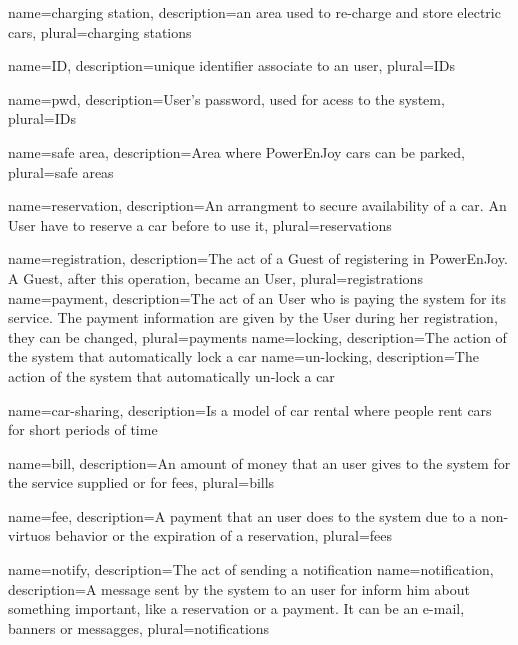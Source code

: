 {
  name={charging station},
  description={an area used to re-charge and store electric cars},
  plural={charging stations}
}

{
  name={ID},
  description={unique identifier associate to an user},
  plural={IDs}
}

{
  name={pwd},
  description={User's password, used for acess to the system},
  plural={IDs}
}

{
  name={safe area},
  description={Area where PowerEnJoy cars can be parked},
  plural={safe areas}
}

{
  name={reservation},
  description={An arrangment to secure availability of a car. An User have to reserve a car before to use it},
  plural={reservations}
}


{
	name={registration},
	description={The act of a Guest of registering in PowerEnJoy. A Guest, after this operation, became an User},
	plural={registrations}
}
{
	name={payment},
	description={The act of an User who is paying the system for its service. The payment information are given by the User during her \gls{registration}, they can be changed},
	plural={payments}
}
{
	name={locking},
	description={The action of the system that automatically lock a car}
}
{
	name={un-locking},
	description={The action of the system that automatically un-lock a car}
}

{
	name={car-sharing},
	description={Is a model of car rental where people rent cars for short periods of time}
}

{
	name={bill},
	description={An amount of money that an user gives to the system for the service supplied or for fees},
	plural={bills}
}

{
	name={fee},
	description={A payment that an user does to the system due to a non-virtuos behavior or the expiration of a reservation},
	plural={fees}
}

{
	name={notify},
	description={The act of sending a notification}
}
{
	name={notification},
	description={A message sent by the system to an user for inform him about something important, like a reservation or a payment. It can be an e-mail, banners or messagges},
	plural={notifications}
}

